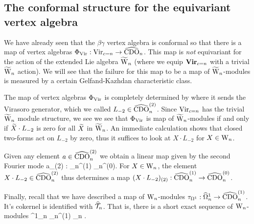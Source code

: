 


\subsection{The conformal structure for the equivariant vertex algebra}

We have already seen that the $\beta\gamma$ vertex algebra is
conformal so that there is a map of vertex algebras $\Phi_{\rm Vir} :
{\rm Vir}_{c=n} \to \hCDO_n$. This map is {\em not} equivariant for
the action of the extended Lie algebra $\TVect$ (where we equip ${\bf
  Vir}_{c=n}$ with a trivial $\TVect$ action). We will see that the
failure for this map to be a map of $\TVect$-modules is measured by a
certain Gelfand-Kazhdan characteristic class. 

The map of vertex algebras $\Phi_{\rm Vir}$ is completely determined
by where it sends the Virasoro generator, which we called $L_{-2} \in
\hCDO_n^{(2)}$. Since ${\rm Vir}_{c=n}$ has the trivial $\TVect$
module structure, we see we see that $\Phi_{\rm Vir}$ is map of $\TVect$-modules if and only if $\Tilde{X} \cdot L_{-2}$ is zero for all $\Tilde{X}$ in $\TVect$. An immediate calculation shows that closed two-forms act on $L_{-2}$ by zero, thus it suffices to look at $X \cdot L_{-2}$ for $X \in \Vect$. 

Given any element $a \in \hCDO_n^{(2)}$ we obtain a linear map given
by the second Fourier mode
\ben
a_{(2)} : \hCDO_n^{(1)} \to \hCDO_n^{(0)}. 
\een 
For $X \in \Vect$, the element $X \cdot L_{-2} \in \hCDO_n^{(2)}$ thus determines a map $(X \cdot L_{-2})_{(2)} : \hCDO_n^{(1)} \to \hCDO_n^{(0)}$. 

Finally, recall that we have described a map of $\Vect$-modules $\tau_{\Omega^1} : \hOmega^1_n \to \hCDO_n^{(1)}$. It's cokernel is identified with $\hT_n$. That is, there is a short exact sequence of $\Vect$-modules
 \to \hOmega^1_n \to \hCDO_n^{(1)} \to \hT_n  .
\een 

